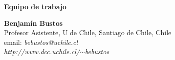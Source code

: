 \begin{center}
{\bf \Huge Equipo de trabajo}
\end{center}
\vspace{1cm}

\begin{center}
\textbf{Benjamín Bustos}\\
Profesor Asistente, U de Chile, Santiago de Chile, Chile\\
email: \textit{bebustos@uchile.cl}\\
\textit{http://www.dcc.uchile.cl/$\sim$bebustos}
\end{center}


